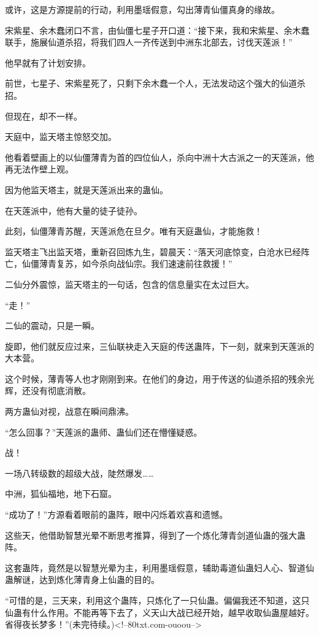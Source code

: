 \begin{this_body}
或许，这是方源提前的行动，利用墨瑶假意，勾出薄青仙僵真身的缘故。

宋紫星、余木蠢闭口不言，由仙僵七星子开口道：“接下来，我和宋紫星、余木蠢联手，施展仙道杀招，将我们四人一齐传送到中洲东北部去，讨伐天莲派！”

他早就有了计划安排。

前世，七星子、宋紫星死了，只剩下余木蠢一个人，无法发动这个强大的仙道杀招。

但现在，却不一样。

天庭中，监天塔主惊怒交加。

他看着壁画上的以仙僵薄青为首的四位仙人，杀向中洲十大古派之一的天莲派，他再无法作壁上观。

因为他监天塔主，就是天莲派出来的蛊仙。

在天莲派中，他有大量的徒子徒孙。

此刻，仙僵薄青苏醒，天莲派危在旦夕。唯有天庭蛊仙，才能施救！

监天塔主飞出监天塔，重新召回炼九生，碧晨天：“落天河底惊变，白沧水已经阵亡，仙僵薄青复苏，如今杀向战仙宗。我们速速前往救援！”

二仙分外震惊，监天塔主的一句话，包含的信息量实在太过巨大。

“走！”

二仙的震动，只是一瞬。

旋即，他们就反应过来，三仙联袂走入天庭的传送蛊阵，下一刻，就来到天莲派的大本营。

这个时候，薄青等人也才刚刚到来。在他们的身边，用于传送的仙道杀招的残余光辉，还没有彻底消散。

两方蛊仙对视，战意在瞬间鼎沸。

“怎么回事？”天莲派的蛊师、蛊仙们还在懵懂疑惑。

战！

一场八转级数的超级大战，陡然爆发……

中洲，狐仙福地，地下石窟。

“成功了！”方源看着眼前的蛊阵，眼中闪烁着欢喜和遗憾。

这些天，他借助智慧光晕不断思考推算，得到了一个炼化薄青剑道仙蛊的强大蛊阵。

这套蛊阵，竟然是以智慧光晕为主，利用墨瑶假意，辅助毒道仙蛊妇人心、智道仙蛊解谜，达到炼化薄青身上仙蛊的目的。

“可惜的是，三天来，利用这个蛊阵，只炼化了一只仙蛊。偏偏我还不知道，这只仙蛊有什么作用。不能再等下去了，义天山大战已经开始，越早收取仙蛊屋越好。省得夜长梦多！”(未完待续。)<!--80txt.com-ouoou-->

\end{this_body}

